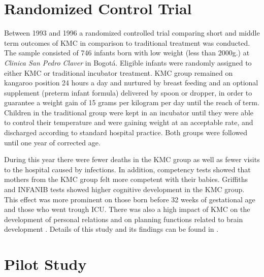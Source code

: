 \section{Randomized Control Trial}

Between 1993 and 1996 a randomized controlled trial comparing short and middle term outcomes of KMC in comparison to traditional treatment was conducted. The sample consisted of 746 infants born with low weight (less than 2000g.) at \emph{Clinica San Pedro Claver} in Bogotá. Eligible infants were randomly assigned to either KMC or traditional incubator treatment. KMC group remained on kangaroo position 24 hours a day and nurtured by breast feeding and an optional supplement (preterm infant formula) delivered by spoon or dropper, in order to guarantee a weight gain of 15 grams per kilogram per day until the reach of term. Children in the traditional group were kept in an incubator until they were able to control their temperature and were gaining weight at an acceptable rate, and discharged according to standard hospital practice. Both groups were followed until one year of corrected age. 

During this year there were fewer deaths in the KMC group as well as fewer visits to the hospital caused by infections. In addition, competency tests showed that mothers from the KMC group felt more competent with their babies. Griffiths and INFANIB tests showed higher cognitive development in the KMC group. This effect was more prominent on those born before 32 weeks of gestational age and those who went trough ICU. There was also a high impact of KMC on the development of personal relations and on planning functions related to brain development \autocite{tessier_kangaroo_2003}. Details of this study and its findings can be found in \autocite{charpak_current_1996,charpak_kangaroo_1997,charpak_randomized_2001,charpak_kangaroo_2005}.



\section{Pilot Study}


